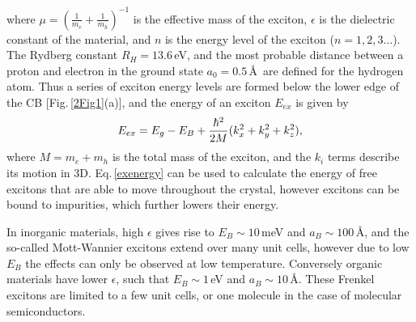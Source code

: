 where $\mu = (\frac{1}{m_e}+\frac{1}{m_h})^{-1}$ is the effective mass of the exciton, $\epsilon$ is the dielectric constant of the material, and $n$ is the energy level of the exciton ($n=1, 2, 3...$). The Rydberg constant $R_H=13.6$\,eV, and the most probable distance between a proton and electron in the ground state $a_0=0.5$\,\AA\, are defined for the hydrogen atom. Thus a series of exciton energy levels are formed below the lower edge of the CB [Fig.\,\ref{2Fig1}(a)], and the energy of an exciton $E_{ex}$ is given by
\begin{equation}
\centering
E_{ex} = E_g - E_B + \frac{\hbar^2}{2M}(k_x^2+k_y^2+k_z^2),
\label{exenergy}
\end{equation}
where $M = m_e+m_h$ is the total mass of the exciton, and the $k_i$ terms describe its motion in 3D. Eq.\,\ref{exenergy} can be used to calculate the energy of free excitons that are able to move throughout the crystal, however excitons can be bound to impurities, which further lowers their energy.

In inorganic materials, high $\epsilon$ gives rise to $E_B \sim 10$\,meV and $a_B \sim 100$\,\AA, and the so-called Mott-Wannier excitons extend over many unit cells, however due to low $E_B$ the effects can only be observed at low temperature. Conversely organic materials have lower $\epsilon$, such that $E_B \sim 1$\,eV and $a_B \sim 10$\,\AA. These Frenkel excitons are limited to a few unit cells, or one molecule in the case of molecular semiconductors.

